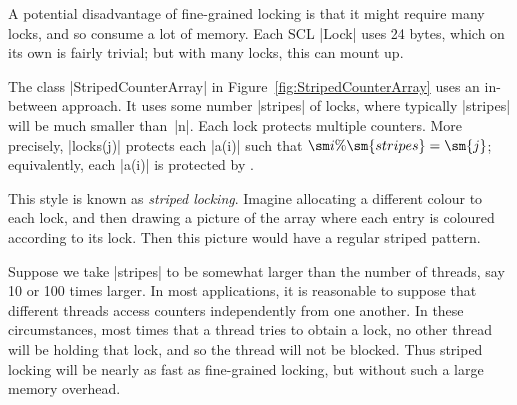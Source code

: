 
A potential disadvantage of fine-grained locking is that it might require many
locks, and so consume a lot of memory.  Each SCL |Lock| uses 24 bytes, which
on its own is fairly trivial; but with many locks, this can mount up.  

The class |StripedCounterArray| in Figure~\ref{fig:StripedCounterArray} uses
an in-between approach.  It uses some number |stripes| of locks, where
typically |stripes| will be much smaller than~|n|.  Each lock protects
multiple counters.  More precisely, |locks(j)| protects each |a(i)| such that
$\sm i \% \sm{stripes} = \sm{j}$; equivalently, each |a(i)| is protected by
.








This style is known as \emph{striped locking}.  Imagine allocating a different
colour to each lock, and then drawing a picture of the array where each entry
is coloured according to its lock.  Then this picture would have a regular
striped pattern. 

Suppose we take |stripes| to be somewhat larger than the number of threads,
say 10 or 100 times larger.  In most applications, it is reasonable to suppose
that different threads access counters independently from one another.  In
these circumstances, most times that a thread tries to obtain a lock, no other
thread will be holding that lock, and so the thread will not be blocked.  Thus
striped locking will be nearly as fast as fine-grained locking, but without
such a large memory overhead.  

